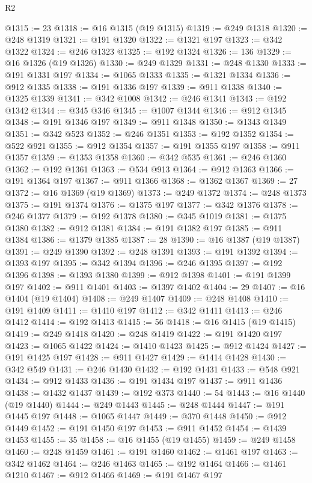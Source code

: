 \begin{lexlean}{R2}
\begin{coremodule}
@1315 := 23
@1318 := @16 @1315 (@19 @1315)
@1319 := @249 @1318
@1320 := @248 @1319
@1321 := @191 @1320
@1322 := @1321 @197
@1323 := @342 @1322
@1324 := @246 @1323
@1325 := @192 @1324
@1326 := 136
@1329 := @16 @1326 (@19 @1326)
@1330 := @249 @1329
@1331 := @248 @1330
@1333 := @191 @1331 @197
@1334 := @1065 @1333
@1335 := @1321 @1334
@1336 := @912 @1335
@1338 := @191 @1336 @197
@1339 := @911 @1338
@1340 := @1325 @1339
@1341 := @342 @1008
@1342 := @246 @1341
@1343 := @192 @1342
@1344 := @345 @346
@1345 := @1007 @1344
@1346 := @912 @1345
@1348 := @191 @1346 @197
@1349 := @911 @1348
@1350 := @1343 @1349
@1351 := @342 @523
@1352 := @246 @1351
@1353 := @192 @1352
@1354 := @522 @921
@1355 := @912 @1354
@1357 := @191 @1355 @197
@1358 := @911 @1357
@1359 := @1353 @1358
@1360 := @342 @535
@1361 := @246 @1360
@1362 := @192 @1361
@1363 := @534 @913
@1364 := @912 @1363
@1366 := @191 @1364 @197
@1367 := @911 @1366
@1368 := @1362 @1367
@1369 := 27
@1372 := @16 @1369 (@19 @1369)
@1373 := @249 @1372
@1374 := @248 @1373
@1375 := @191 @1374
@1376 := @1375 @197
@1377 := @342 @1376
@1378 := @246 @1377
@1379 := @192 @1378
@1380 := @345 @1019
@1381 := @1375 @1380
@1382 := @912 @1381
@1384 := @191 @1382 @197
@1385 := @911 @1384
@1386 := @1379 @1385
@1387 := 28
@1390 := @16 @1387 (@19 @1387)
@1391 := @249 @1390
@1392 := @248 @1391
@1393 := @191 @1392
@1394 := @1393 @197
@1395 := @342 @1394
@1396 := @246 @1395
@1397 := @192 @1396
@1398 := @1393 @1380
@1399 := @912 @1398
@1401 := @191 @1399 @197
@1402 := @911 @1401
@1403 := @1397 @1402
@1404 := 29
@1407 := @16 @1404 (@19 @1404)
@1408 := @249 @1407
@1409 := @248 @1408
@1410 := @191 @1409
@1411 := @1410 @197
@1412 := @342 @1411
@1413 := @246 @1412
@1414 := @192 @1413
@1415 := 56
@1418 := @16 @1415 (@19 @1415)
@1419 := @249 @1418
@1420 := @248 @1419
@1422 := @191 @1420 @197
@1423 := @1065 @1422
@1424 := @1410 @1423
@1425 := @912 @1424
@1427 := @191 @1425 @197
@1428 := @911 @1427
@1429 := @1414 @1428
@1430 := @342 @549
@1431 := @246 @1430
@1432 := @192 @1431
@1433 := @548 @921
@1434 := @912 @1433
@1436 := @191 @1434 @197
@1437 := @911 @1436
@1438 := @1432 @1437
@1439 := @192 @373
@1440 := 54
@1443 := @16 @1440 (@19 @1440)
@1444 := @249 @1443
@1445 := @248 @1444
@1447 := @191 @1445 @197
@1448 := @1065 @1447
@1449 := @370 @1448
@1450 := @912 @1449
@1452 := @191 @1450 @197
@1453 := @911 @1452
@1454 := @1439 @1453
@1455 := 35
@1458 := @16 @1455 (@19 @1455)
@1459 := @249 @1458
@1460 := @248 @1459
@1461 := @191 @1460
@1462 := @1461 @197
@1463 := @342 @1462
@1464 := @246 @1463
@1465 := @192 @1464
@1466 := @1461 @1210
@1467 := @912 @1466
@1469 := @191 @1467 @197

\end{coremodule}
\end{lexlean}
